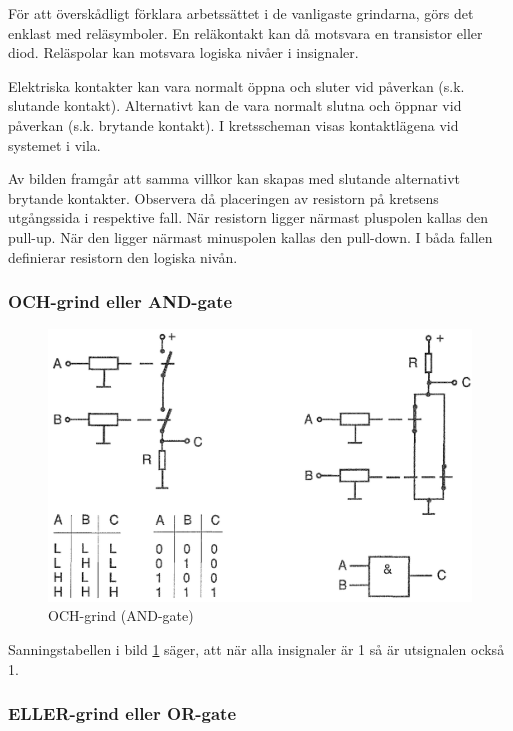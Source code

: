 För att överskådligt förklara arbetssättet i de vanligaste grindarna, görs det
enklast med reläsymboler. En reläkontakt kan då motsvara en transistor eller
diod. Reläspolar kan motsvara logiska nivåer i insignaler.

Elektriska kontakter kan vara normalt öppna och sluter vid påverkan (s.k.
slutande kontakt). Alternativt kan de vara normalt slutna och öppnar vid
påverkan (s.k. brytande kontakt). I kretsscheman visas kontaktlägena vid
systemet i vila.

Av bilden framgår att samma villkor kan skapas med slutande alternativt brytande
kontakter. Observera då placeringen av resistorn på kretsens utgångssida i
respektive fall. När resistorn ligger närmast pluspolen kallas den pull-up. När
den ligger närmast minuspolen kallas den pull-down. I båda fallen definierar
resistorn den logiska nivån.

\subsubsection{OCH-grind eller AND-gate}

\begin{figure}
\includegraphics[width=\textwidth]{images/cropped_pdfs/bild_2_2-37.pdf}
\caption{OCH-grind (AND-gate)}
\label{fig:BildII2-37}
\end{figure}

Sanningstabellen i bild \ref{fig:BildII2-37} säger, att när alla insignaler
är 1 så är utsignalen också 1.

\subsubsection{ELLER-grind eller OR-gate}

